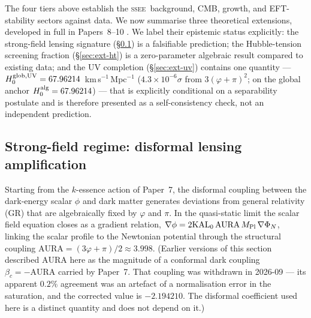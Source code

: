 \documentclass[12pt,a4paper]{article}
\newcommand{\SSEE}{\textsc{ssee}}
\newcommand{\phiG}{\varphi}
\newcommand{\KAL}{\mathrm{KAL}_0}
\newcommand{\AURA}{\mathrm{AURA}}
\begin{document}
The four tiers above establish the \SSEE\ background, CMB, growth, and
EFT-stability sectors against data. We now summarise three theoretical
extensions, developed in full in Papers~8--10 \citep{AlmeidaSSEE2026P8,
AlmeidaSSEE2026P9,AlmeidaSSEE2026P10}. We label their epistemic status
explicitly: the strong-field lensing signature (\S\ref{sec:ext-sg}) is a
falsifiable prediction; the Hubble-tension screening fraction
(\S\ref{sec:ext-ht}) is a zero-parameter algebraic result compared to existing
data; and the UV completion (\S\ref{sec:ext-uv}) contains one quantity ---
$H_0^{\rm glob,UV} = 67.96214$~km\,s$^{-1}$\,Mpc$^{-1}$ ($4.3{\times}10^{-6}\sigma$ from $3(\varphi+\pi)^2$; on
the global anchor $H_0^{\rm alg}=67.96214$) --- that is explicitly
conditional on a separability postulate and is therefore presented as a
self-consistency check, not an independent prediction.

\subsection{Strong-field regime: disformal lensing amplification}
\label{sec:ext-sg}

Starting from the $k$-essence action of Paper~7, the disformal coupling between
the dark-energy scalar $\phi$ and dark matter generates deviations from general
relativity (GR) that are algebraically fixed by $\phiG$ and $\pi$. In the
quasi-static limit the scalar field equation closes as a gradient relation,
$\nabla\phi = 2\KAL\,\AURA\,M_{\rm Pl}\,\nabla\Phi_N$, linking the scalar
profile to the Newtonian potential through the structural coupling
$\AURA = (3\phiG+\pi)/2 \approx 3.998$.  (Earlier versions of this section
described $\AURA$ here as the magnitude of a conformal dark coupling
$\beta_c = -\AURA$ carried by Paper~7.  That coupling was withdrawn in
2026-09 --- its apparent $0.2\%$ agreement was an artefact of a normalisation
error in the saturation, and the corrected value is $-2.194210$.  The
disformal coefficient used here is a distinct quantity and does not depend
on it.)
\end{document}
